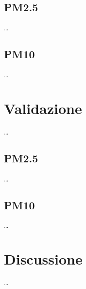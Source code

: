 \subsection{PM2.5}\label{ssec:risultati-pm2.5}
\ldots

\subsection{PM10}\label{ssec:risultati-pm10}
\ldots

\section{Validazione}\label{sec:validazione}
\ldots

\subsection{PM2.5}\label{ssec:validazione-pm2.5}
\ldots

\subsection{PM10}\label{ssec:validazione-pm10}
\ldots

\section{Discussione}\label{sec:discussione}
\ldots